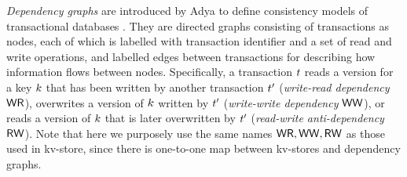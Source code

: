 \emph{Dependency graphs} are introduced by Adya to define consistency models of transactional databases \cite{adya}. 
They are directed graphs consisting of transactions as nodes, 
each of which is labelled with transaction identifier and a set of read and write operations,
and labelled edges between transactions for describing how information flows between nodes. 
Specifically, a transaction $t$ reads a version for a key $k$ that has been written by another transaction $t'$ 
(\emph{write-read dependency} \( \mathsf{WR}\)), overwrites a version of $k$ written by $t'$ (\emph{write-write dependency} \( \mathsf{WW} \)),
or reads a version of $k$ that is later overwritten by $t'$ (\emph{read-write anti-dependency} \( \mathsf{RW} \)).
Note that here we purposely use the same names \( \mathsf{WR}, \mathsf{WW}, \mathsf{RW} \) as those used in kv-store,
since there is one-to-one map between kv-stores and dependency graphs.

